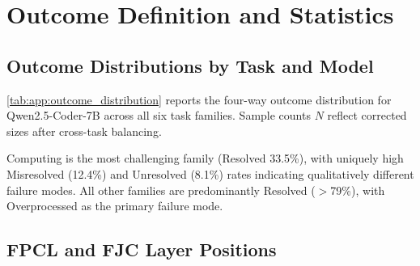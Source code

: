\section{Outcome Definition and Statistics}
\label{app:outcome_distribution_statistics}

\subsection{Outcome Distributions by Task and Model}
\label{app:subsec:outcome_results_by_task}

\cref{tab:app:outcome_distribution} reports the four-way outcome distribution for Qwen2.5-Coder-7B across all six task families.
Sample counts $N$ reflect corrected sizes after cross-task balancing.

\begin{table}[H]
\centering
\caption{Four-way outcome distribution for Qwen2.5-Coder-7B across all six task families.
$N$ denotes the corrected sample count after balancing across tasks (see text).}
\label{tab:app:outcome_distribution}
\end{table}

Computing is the most challenging family (Resolved 33.5\%), with uniquely high Misresolved (12.4\%) and Unresolved (8.1\%) rates indicating qualitatively different failure modes.
All other families are predominantly Resolved ($>$79\%), with Overprocessed as the primary failure mode.

\subsection{FPCL and FJC Layer Positions}
\label{app:subsec:fpcl_fjc_layer_positions}

